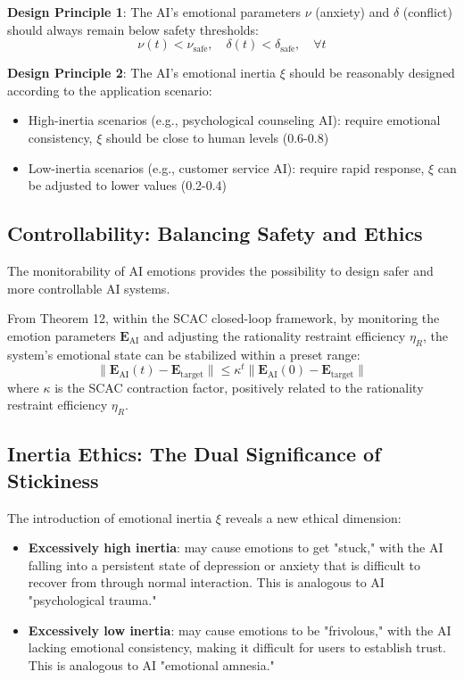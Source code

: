 \documentclass[12pt,a4paper]{article}
\theoremstyle{plain}
\newcommand{\ve}[1]{\bm{#1}}                    %
\newcommand{\Evec}{\ve{E}}                        %
\begin{document}
\textbf{Design Principle 1}: The AI's emotional parameters $\nu$ (anxiety) and $\delta$ (conflict) should always remain below safety thresholds:
\begin{equation}
\nu(t) < \nu_{\text{safe}}, \quad \delta(t) < \delta_{\text{safe}}, \quad \forall t
\end{equation}

\textbf{Design Principle 2}: The AI's emotional inertia $\xi$ should be reasonably designed according to the application scenario:
\begin{itemize}
    \item High-inertia scenarios (e.g., psychological counseling AI): require emotional consistency, $\xi$ should be close to human levels (0.6-0.8)
    \item Low-inertia scenarios (e.g., customer service AI): require rapid response, $\xi$ can be adjusted to lower values (0.2-0.4)
\end{itemize}

\subsection{Controllability: Balancing Safety and Ethics}

The monitorability of AI emotions provides the possibility to design safer and more controllable AI systems.

From Theorem 12, within the SCAC closed-loop framework, by monitoring the emotion parameters $\Evec_{\text{AI}}$ and adjusting the rationality restraint efficiency $\eta_R$, the system's emotional state can be stabilized within a preset range:
\begin{equation}
\|\Evec_{\text{AI}}(t) - \Evec_{\text{target}}\| \leq \kappa^t \|\Evec_{\text{AI}}(0) - \Evec_{\text{target}}\|
\end{equation}
where $\kappa$ is the SCAC contraction factor, positively related to the rationality restraint efficiency $\eta_R$.

\subsection{Inertia Ethics: The Dual Significance of Stickiness}

The introduction of emotional inertia $\xi$ reveals a new ethical dimension:

\begin{itemize}
    \item \textbf{Excessively high inertia}: may cause emotions to get "stuck," with the AI falling into a persistent state of depression or anxiety that is difficult to recover from through normal interaction. This is analogous to AI "psychological trauma."
    \item \textbf{Excessively low inertia}: may cause emotions to be "frivolous," with the AI lacking emotional consistency, making it difficult for users to establish trust. This is analogous to AI "emotional amnesia."
\end{itemize}
\end{document}
